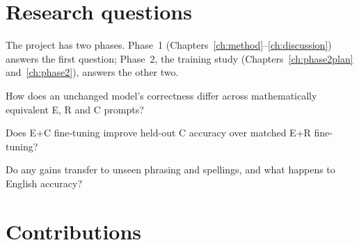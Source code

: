 \documentclass[12pt,a4paper,oneside]{report}
\renewcommand{\_}{\oldunderscore\allowbreak}
\begin{document}
\section{Research questions}

The project has two phases. Phase~1 (Chapters~\ref{ch:method}--\ref{ch:discussion}) answers the first question; Phase~2, the training study (Chapters~\ref{ch:phase2plan} and~\ref{ch:phase2}), answers the other two.

\begin{description}[leftmargin=1.2cm,style=nextline]
\item[RQ1 (Phase 1)] How does an unchanged model's correctness differ across mathematically equivalent E, R and C prompts?
\item[RQ2 (training study)] Does E+C fine-tuning improve held-out C accuracy over matched E+R fine-tuning?
\item[RQ3 (training study)] Do any gains transfer to unseen phrasing and spellings, and what happens to English accuracy?
\end{description}

\section{Contributions}
\end{document}
